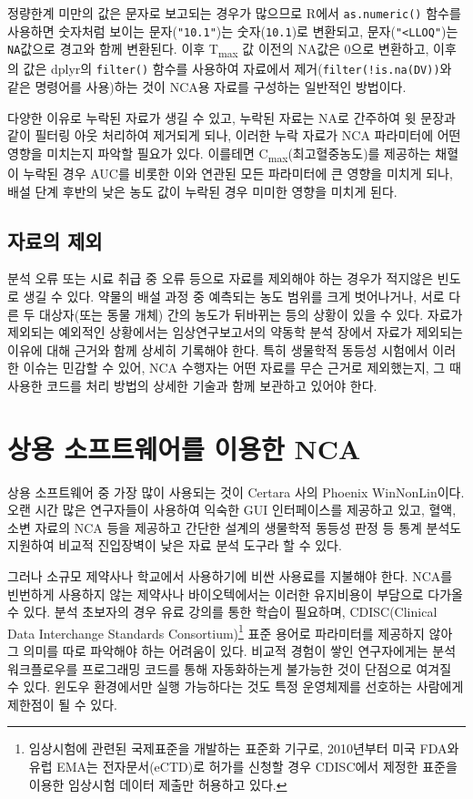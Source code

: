 \documentclass[
  11pt,
  krantz2, a4paper, twoside]{krantz}
\theoremstyle{definition}
\theoremstyle{definition}
\theoremstyle{definition}
\theoremstyle{definition}
\theoremstyle{remark}
\begin{document}
정량한계 미만의 값은 문자로 보고되는 경우가 많으므로 R에서 \texttt{as.numeric()} 함수를 사용하면 숫자처럼 보이는 문자(\texttt{"10.1"})는 숫자(\texttt{10.1})로 변환되고, 문자(\texttt{"\textless{}LLOQ"})는 \texttt{NA}값으로 경고와 함께 변환된다. 이후 T\textsubscript{max} 값 이전의 NA값은 0으로 변환하고, 이후의 값은 dplyr의 \texttt{filter()} 함수를 사용하여 자료에서 제거(\texttt{filter(!is.na(DV))}와 같은 명령어를 사용)하는 것이 NCA용 자료를 구성하는 일반적인 방법이다.

다양한 이유로 누락된 자료가 생길 수 있고, 누락된 자료는 NA로 간주하여 윗 문장과 같이 필터링 아웃 처리하여 제거되게 되나, 이러한 누락 자료가 NCA 파라미터에 어떤 영향을 미치는지 파악할 필요가 있다. 이를테면 C\textsubscript{max}(최고혈중농도)를 제공하는 채혈이 누락된 경우 AUC를 비롯한 이와 연관된 모든 파라미터에 큰 영향을 미치게 되나, 배설 단계 후반의 낮은 농도 값이 누락된 경우 미미한 영향을 미치게 된다.

\subsection{자료의 제외}\label{uxc790uxb8ccuxc758-uxc81cuxc678}

분석 오류 또는 시료 취급 중 오류 등으로 자료를 제외해야 하는 경우가 적지않은 빈도로 생길 수 있다. 약물의 배설 과정 중 예측되는 농도 범위를 크게 벗어나거나, 서로 다른 두 대상자(또는 동물 개체) 간의 농도가 뒤바뀌는 등의 상황이 있을 수 있다. 자료가 제외되는 예외적인 상황에서는 임상연구보고서의 약동학 분석 장에서 자료가 제외되는 이유에 대해 근거와 함께 상세히 기록해야 한다. 특히 생물학적 동등성 시험에서 이러한 이슈는 민감할 수 있어, NCA 수행자는 어떤 자료를 무슨 근거로 제외했는지, 그 때 사용한 코드를 처리 방법의 상세한 기술과 함께 보관하고 있어야 한다. 

\section{상용 소프트웨어를 이용한 NCA}\label{uxc0c1uxc6a9-uxc18cuxd504uxd2b8uxc6e8uxc5b4uxb97c-uxc774uxc6a9uxd55c-nca}

상용 소프트웨어 중 가장 많이 사용되는 것이 Certara 사의 Phoenix WinNonLin이다. 오랜 시간 많은 연구자들이 사용하여 익숙한 GUI 인터페이스를 제공하고 있고, 혈액, 소변 자료의 NCA 등을 제공하고 간단한 설계의 생물학적 동등성 판정 등 통계 분석도 지원하여 비교적 진입장벽이 낮은 자료 분석 도구라 할 수 있다. 

그러나 소규모 제약사나 학교에서 사용하기에 비싼 사용료를 지불해야 한다. NCA를 빈번하게 사용하지 않는 제약사나 바이오텍에서는 이러한 유지비용이 부담으로 다가올 수 있다.
분석 초보자의 경우 유료 강의를 통한 학습이 필요하며, CDISC(Clinical Data Interchange Standards Consortium)\footnote{임상시험에 관련된 국제표준을 개발하는 표준화 기구로, 2010년부터 미국 FDA와 유럽 EMA는 전자문서(eCTD)로 허가를 신청할 경우 CDISC에서 제정한 표준을 이용한 임상시험 데이터 제출만 허용하고 있다.} 표준 용어로 파라미터를 제공하지 않아 그 의미를 따로 파악해야 하는 어려움이 있다.
비교적 경험이 쌓인 연구자에게는 분석 워크플로우를 프로그래밍 코드를 통해 자동화하는게 불가능한 것이 단점으로 여겨질 수 있다.
윈도우 환경에서만 실행 가능하다는 것도 특정 운영체제를 선호하는 사람에게 제한점이 될 수 있다.
\end{document}
